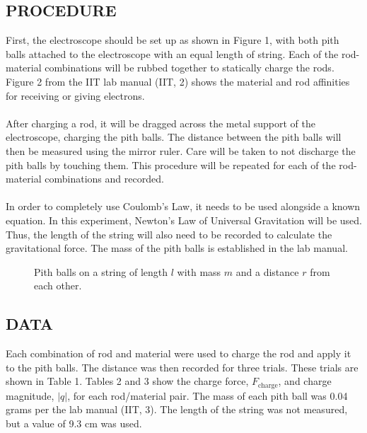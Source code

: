 \documentclass [12pt, letterpaper, twoside] {article}
\begin{document}
\subsection* {PROCEDURE}
First, the electroscope should be set up as shown in Figure 1, with both pith balls attached to the electroscope with an equal length of string. Each of the rod-material combinations will be rubbed together to statically charge the rods. Figure 2 from the IIT lab manual (IIT, 2) shows the material and rod affinities for receiving or giving electrons. \\\\
After charging a rod, it will be dragged across the metal support of the electroscope, charging the pith balls. The distance between the pith balls will then be measured using the mirror ruler. Care will be taken to not discharge the pith balls by touching them. This procedure will be repeated for each of the rod-material combinations and recorded. \\\\
In order to completely use Coulomb's Law, it needs to be used alongside a known equation. In this experiment, Newton's Law of Universal Gravitation will be used. Thus, the length of the string will also need to be recorded to calculate the gravitational force. The mass of the pith balls is established in the lab manual.

\begin{figure}
  \begin{center}
    \caption{Pith balls on a string of length \(l\) with mass \(m\) and a distance \(r\) from each other.}
  \end{center}
\end{figure}

\subsection* {DATA}
Each combination of rod and material were used to charge the rod and apply it to the pith balls. The distance was then recorded for three trials. These trials are shown in Table 1. Tables 2 and 3 show the charge force, \(F_{\text{charge}}\), and charge magnitude, \(|q|\), for each rod/material pair. The mass of each pith ball was 0.04 grams per the lab manual (IIT, 3). The length of the string was not measured, but a value of 9.3 cm was used.
\end{document}
